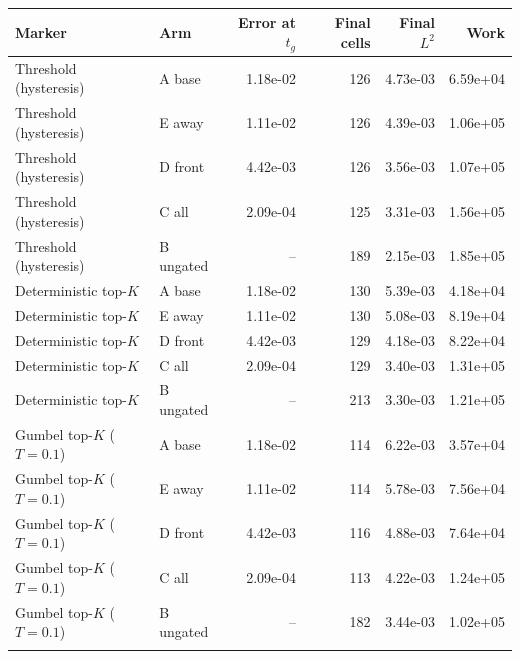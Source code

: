 \begin{tabular}{llrrrr}
\toprule
Marker & Arm & Error at $t_g$ & Final cells & Final $L^2$ & Work \\
\midrule
Threshold (hysteresis) & A base & 1.18e-02 & 126 & 4.73e-03 & 6.59e+04 \\
Threshold (hysteresis) & E away & 1.11e-02 & 126 & 4.39e-03 & 1.06e+05 \\
Threshold (hysteresis) & D front & 4.42e-03 & 126 & 3.56e-03 & 1.07e+05 \\
Threshold (hysteresis) & C all & 2.09e-04 & 125 & 3.31e-03 & 1.56e+05 \\
Threshold (hysteresis) & B ungated & -- & 189 & 2.15e-03 & 1.85e+05 \\
\addlinespace
Deterministic top-$K$ & A base & 1.18e-02 & 130 & 5.39e-03 & 4.18e+04 \\
Deterministic top-$K$ & E away & 1.11e-02 & 130 & 5.08e-03 & 8.19e+04 \\
Deterministic top-$K$ & D front & 4.42e-03 & 129 & 4.18e-03 & 8.22e+04 \\
Deterministic top-$K$ & C all & 2.09e-04 & 129 & 3.40e-03 & 1.31e+05 \\
Deterministic top-$K$ & B ungated & -- & 213 & 3.30e-03 & 1.21e+05 \\
\addlinespace
Gumbel top-$K$ ($T=0.1$) & A base & 1.18e-02 & 114 & 6.22e-03 & 3.57e+04 \\
Gumbel top-$K$ ($T=0.1$) & E away & 1.11e-02 & 114 & 5.78e-03 & 7.56e+04 \\
Gumbel top-$K$ ($T=0.1$) & D front & 4.42e-03 & 116 & 4.88e-03 & 7.64e+04 \\
Gumbel top-$K$ ($T=0.1$) & C all & 2.09e-04 & 113 & 4.22e-03 & 1.24e+05 \\
Gumbel top-$K$ ($T=0.1$) & B ungated & -- & 182 & 3.44e-03 & 1.02e+05 \\
\addlinespace
\bottomrule
\end{tabular}

